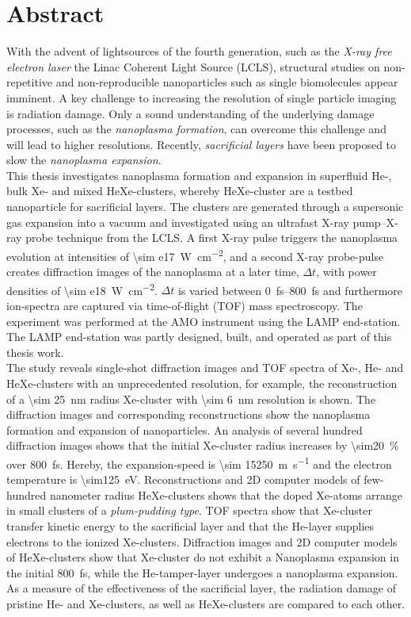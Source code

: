 \section*{Abstract}\label{ch:abstract}
With the advent of lightsources of the fourth generation, such as the \textit{X-ray free electron laser} the Linac Coherent Light Source (LCLS), structural studies on non-repetitive and non-reproducible nanoparticles such as single biomolecules appear imminent. A key challenge to increasing the resolution of single particle imaging is radiation damage. Only a sound understanding of the underlying damage processes, such as the \textit{nanoplasma formation}, can overcome this challenge and will lead to higher resolutions. Recently, \textit{sacrificial layers} have been proposed to slow the \textit{nanoplasma expansion}.\\[0.4\baselineskip]
%
This thesis investigates nanoplasma formation and expansion in superfluid He-, bulk Xe- and mixed HeXe-clusters, whereby HeXe-cluster are a testbed nanoparticle for sacrificial layers. The clusters are generated through a supersonic gas expansion into a vacuum and investigated using an ultrafast X-ray pump--X-ray probe technique from the LCLS. A first X-ray pulse triggers the nanoplasma evolution at intensities of \SI{\sim e17}{\watt\per\square\centi\meter}, and a second X-ray probe-pulse creates diffraction images of the nanoplasma at a later time, $\Delta t$, with power densities of \SI{\sim e18}{\watt\per\square\centi\meter}. $\Delta t$ is varied between \SIrange{0}{800}{\femto\second} and furthermore ion-spectra are captured via time-of-flight (TOF) mass spectroscopy. The experiment was performed at the AMO instrument using the LAMP end-station. The LAMP end-station was partly designed, built, and operated as part of this thesis work.\\[0.4\baselineskip]
%
The study reveals single-shot diffraction images and TOF spectra of Xe-, He- and HeXe-clusters with an unprecedented resolution, for example, the reconstruction of a \SI{\sim 25}{\nano\meter} radius Xe-cluster with \SI{\sim 6}{\nano\meter} resolution is shown. The diffraction images and corresponding reconstructions show the nanoplasma formation and expansion of nanoparticles. An analysis of several hundred diffraction images shows that the initial Xe-cluster radius increases by \SI{\sim20}{\percent} over \SI{800}{\femto\second}. Hereby, the expansion-speed is \SI{\sim 15250}{\meter\per\second} and the electron temperature is \SI{\sim125}{\electronvolt}. Reconstructions and 2D computer models of few-hundred nanometer radius HeXe-clusters shows that the doped Xe-atoms arrange in small clusters of a \textit{plum-pudding type}. TOF spectra show that Xe-cluster transfer kinetic energy to the sacrificial layer and that the He-layer supplies electrons to the ionized Xe-clusters. Diffraction images and 2D computer models of HeXe-clusters show that Xe-cluster do not exhibit a Nanoplasma expansion in the initial \SI{800}{\femto\second}, while the He-tamper-layer undergoes a nanoplasma expansion. As a measure of the effectiveness of the sacrificial layer, the radiation damage of pristine He- and Xe-clusters, as well as HeXe-clusters are compared to each other.
%
%
%
%